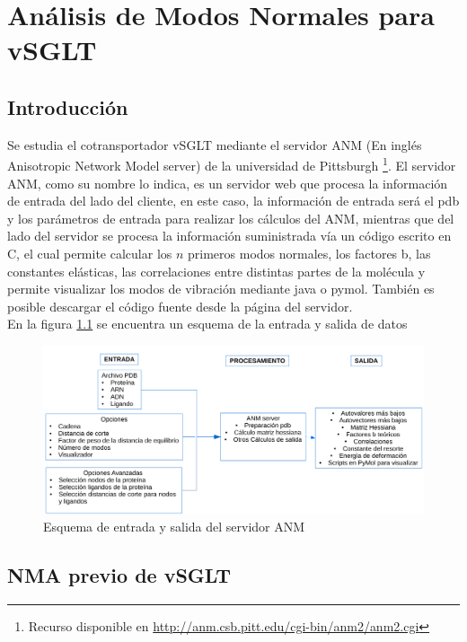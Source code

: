 \chapter{An\'{a}lisis de Modos Normales para vSGLT}\label{ch:4}

\section{Introducci\'{o}n}
Se estudia el cotransportador vSGLT mediante el servidor ANM (En ingl\'{e}s Anisotropic Network Model server) de la universidad de Pittsburgh \cite{Eyal2015}\footnote{Recurso disponible en \url{http://anm.csb.pitt.edu/cgi-bin/anm2/anm2.cgi}}. El servidor ANM, como su nombre lo indica, es un servidor web que procesa la informaci\'{o}n de entrada del lado del cliente, en este caso, la informaci\'{o}n de entrada ser\'{a} el pdb y los par\'{a}metros de entrada para realizar los c\'{a}lculos del ANM, mientras que del lado del servidor se procesa la informaci\'{o}n suministrada v\'{i}a un c\'{o}digo escrito en C, el cual permite calcular los $n$ primeros modos normales, los factores b, las constantes el\'{a}sticas, las correlaciones entre distintas partes de la mol\'{e}cula y permite visualizar los modos de vibraci\'{o}n mediante java o pymol. Tambi\'{e}n es posible descargar el c\'{o}digo fuente desde la p\'{a}gina del servidor.\\

En la figura \ref{fig:flujo} se encuentra un esquema de la entrada y salida de datos
\begin{figure}[h]
 \centering
    \includegraphics[scale=0.6]{./Kap4/flujo.pdf} 
\caption{Esquema de entrada y salida del servidor ANM}\label{fig:flujo}
\end{figure}

\section{NMA previo de vSGLT}
